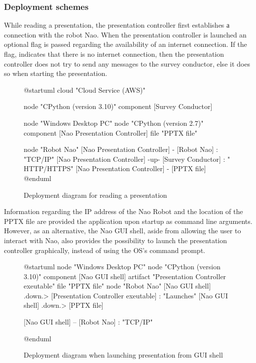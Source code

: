 \documentclass[12pt, fleqn, a4paper]{article}
\begin{document}
\subsubsection{Deployment schemes}
While reading a presentation, the presentation controller first establishes а connection with the robot Nao. When the presentation controller is launched an optional flag is passed regarding the availability of an internet connection. If the flag, indicates that there is no internet connection, then the presentation controller does not try to send any messages to the survey conductor, else it does so when starting the presentation.
\begin{figure}[H]
	\centering
	\begin{plantuml}
@startuml
cloud "Cloud Service (AWS)" {
	node "CPython (version 3.10)" {
		component [Survey Conductor]
	}
	
}

node "Windows Desktop PC" {
	node "CPython (version 2.7)" {
		component [Nao Presentation Controller]
	}
	file "PPTX file"
}

node "Robot Nao"
[Nao Presentation Controller] - [Robot Nao] : "TCP/IP"
[Nao Presentation Controller] -up- [Survey Conductor] : " HTTP/HTTPS"
[Nao Presentation Controller] - [PPTX file]
@enduml
	\end{plantuml}
	\caption{Deployment diagram for reading a presentation}
\end{figure}
Information regarding the IP address of the Nao Robot and the location of the PPTX file are provided the application upon startup as command line arguments. However, as an alternative, the Nao GUI shell, aside from allowing the user to interact with Nao, also provides the possibility to launch the presentation controller graphically, instead of using the OS's command prompt. 
\begin{figure}[H]
	\centering
	\begin{plantuml}
@startuml
node "Windows Desktop PC" {
	node "CPython (version 3.10)" {
		component [Nao GUI shell]
	}
	artifact "Presentation Controller exeutable"
	file "PPTX file"
}
node "Robot Nao"
[Nao GUI shell] .down.> [Presentation Controller exeutable] : "Launches"
[Nao GUI shell] .down.> [PPTX file]

[Nao GUI shell] -- [Robot Nao] : "TCP/IP"

@enduml
	\end{plantuml}
	\caption{Deployment diagram when launching presentation from GUI shell}
\end{figure}
\end{document}
